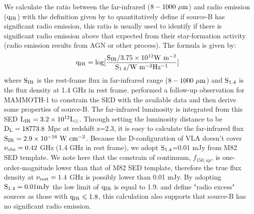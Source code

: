 \documentclass[../Results.tex]{subfiles}
\begin{document}
	 We calculate the ratio between the far-infrared ($\rm 8-1000 \ \mu m$) and radio emission ($\rm q_{IR}$) with the definition given by \cite{ivison2010far} to quantitatively define if source-B has significant radio emission, this ratio is usually used to identify if there is significant radio emission above that expected from their star-formation activity (radio emission results from AGN or other process). The formula is given by:
	\begin{equation}
		\rm q_{IR}=log[\frac{S_{IR}/3.75 \times 10^{12} W \ m^{-2}}{S_{1.4}/W \ m^{-2} Hz^{-1}}]
		\label{q_IR}
	\end{equation}
	where $\rm S_{IR}$ is the rest-frame flux in far-infrared range ($8-1000 \ \rm \mu m $) and $\rm S_{1.4}$ is the flux density at 1.4 GHz in rest frame. \citet{arrigoni2018overdensity} performed a follow-up observation for MAMMOTH-1 to constrain the SED with the available data and then derive some properties of source-B. The far-infrared luminosity is integrated from this SED $\rm L_{IR}=3.2 \times 10^{12}L_{\odot}$. Through setting the luminosity distance to be $\rm D_{L}=18773.8$ Mpc at redshift z=2.3, it is easy to calculate the far-infrared flux $\rm S_{IR}=2.9 \times 10^{-16}\ W \ cm^{-2}$.  Because the D-configuration of VLA doesn't cover $\rm \nu_{obs}=0.42$ GHz (1.4 GHz in rest frame), we adopt $\rm S_{1.4}$=0.01 mJy from M82 SED template. We note here that the constrain of continuum, $f_{150,up}$, is one-order-magnitude lower than that of M82 SED template, therefore the true flux density at $\rm \nu_{rest}=1.4$ GHz is possibly lower than 0.01 mJy. By adopting $\rm S_{1.4}=0.01 mJy$ the low limit of $\rm q_{IR}$ is equal to 1.9. \citet{ivison2010far} and \citet{del2013goods} define "radio excess" sources as those with $\rm q_{IR} \leqslant 1.8$, this calculation also supports that source-B has no significant radio emission.
\end{document}
